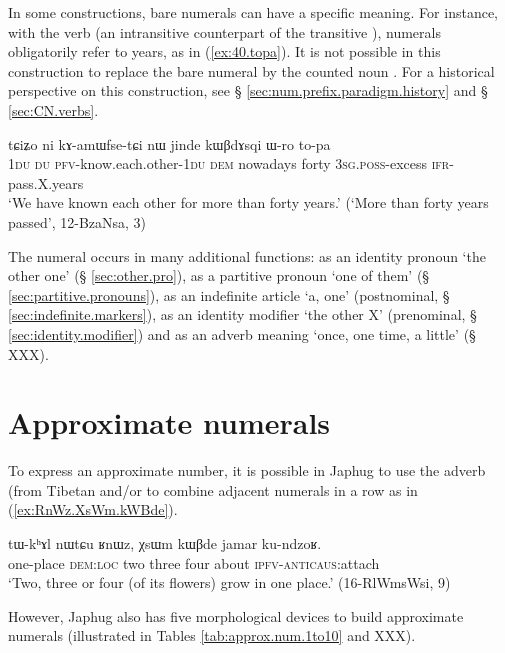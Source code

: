 In some constructions, bare numerals can have a specific meaning. For instance, with the verb  (an intransitive counterpart of the transitive ), numerals obligatorily refer to years, as in (\ref{ex:40.topa}). It is not possible in this construction to replace the bare numeral by the counted noun  . For a historical perspective on this construction, see § \ref{sec:num.prefix.paradigm.history} and § \ref{sec:CN.verbs}.

\begin{exe}
\ex \label{ex:40.topa}  
\gll tɕiʑo ni kɤ-amɯfse-tɕi nɯ jinde kɯβdɤsqi ɯ-ro to-pa \\
\textsc{1du} \textsc{du} \textsc{pfv}-know.each.other-\textsc{1du} \textsc{dem} nowadays forty \textsc{3sg.poss}-excess \textsc{ifr}-pass.X.years \\
\glt  `We have known each other for more than forty years.' (`More than forty years passed', 12-BzaNsa, 3)
\end{exe}		
 
The numeral  occurs in many additional functions: as an identity pronoun `the other one' (§ \ref{sec:other.pro}), as a partitive pronoun `one of them' (§ \ref{sec:partitive.pronouns}), as an indefinite article `a, one' (postnominal, § \ref{sec:indefinite.markers}), as an identity modifier `the other X' (prenominal, § \ref{sec:identity.modifier}) and  as an adverb meaning `once, one time, a little' (§ XXX).
 
\section{Approximate numerals} \label{sec:approx.numerals}
To express an approximate number, it is possible in Japhug to use the adverb  (from Tibetan  and/or to combine adjacent numerals in a row as in (\ref{ex:RnWz.XsWm.kWBde}).

\begin{exe}
\ex \label{ex:RnWz.XsWm.kWBde}
\gll tɯ-kʰɤl nɯtɕu ʁnɯz, χsɯm kɯβde jamar ku-ndzoʁ. \\
one-place \textsc{dem}:\textsc{loc} two three four about \textsc{ipfv}-\textsc{anticaus}:attach \\
\glt `Two, three or four (of its flowers) grow in one place.' (16-RlWmsWsi, 9)
\end{exe}

However, Japhug also has five morphological devices to build approximate numerals (illustrated in Tables \ref{tab:approx.num.1to10} and XXX).


